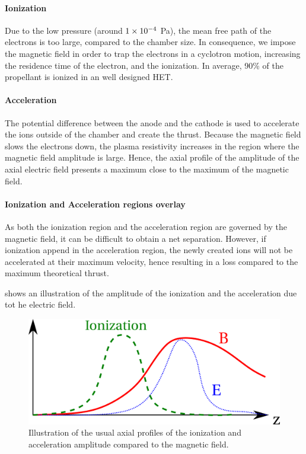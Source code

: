 \paragraph{Ionization}
Due to the low pressure (around ${1}\times 10^{-4}$ Pa), the mean free path of the electrons is too large, compared to the chamber size.
In consequence, we impose the magnetic field in order to trap the electrons in a cyclotron motion, increasing the residence time of the electron, and the ionization.
In average, 90\% of the propellant is ionized in an well designed \ac{HET}.

\paragraph{Acceleration}
The potential difference  between the anode and the cathode is used to accelerate the ions outside of the chamber and create the thrust.
Because the magnetic field slows the electrons down, the plasma resistivity increases in the region where the magnetic field amplitude is large.
Hence, the axial profile of the amplitude of the axial electric field presents a maximum close to the maximum of the magnetic field.

\paragraph{Ionization and Acceleration regions overlay}
As both the ionization region and the acceleration region are governed by the magnetic field, it can be difficult to obtain a net separation.
However, if ionization append in the acceleration region, the newly created ions will not be accelerated at their maximum velocity, hence resulting in a loss compared to the maximum theoretical thrust.

 shows an illustration of the amplitude of the ionization and the acceleration due tot he electric field.
\begin{figure}[hbtp]
  \centering
  \includegraphics[width=\defaultwidth]{zones}
  \caption{Illustration of the usual axial profiles of the ionization and acceleration amplitude compared to the magnetic field.}
  \label{fig-zones}
\end{figure}

